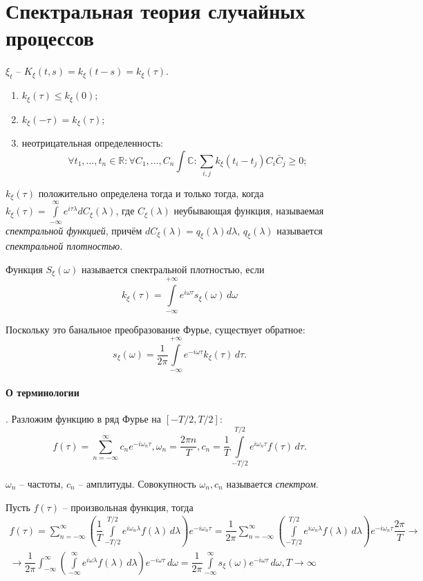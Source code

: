 \section{Спектральная теория случайных процессов}

$\xi_t$ -- $K_\xi(t, s) = k_\xi(t-s) = k_\xi(\tau)$.

\begin{enumerate}
  \item $k_\xi(\tau) \leqslant k_\xi(0)$;
  \item $k_\xi(-\tau) = k_\xi(\tau)$;
  \item неотрицательная определенность:
    \[
      \forall t_1, \dots, t_n \in \mathbb{R} :
      \forall C_1, \dots, C_n \int \mathbb{C}:
      \sum_{i,j} k_\xi(t_i - t_j) C_i \bar{C}_j \geqslant 0;
    \]
\end{enumerate}

\begin{theorem}
  $k_\xi(\tau)$ положительно определена тогда и только тогда, когда
  $k_\xi(\tau) = \int\limits_{-\infty}^{\infty} e^{i \tau \lambda} dC_\xi(\lambda)$,
  где $C_{\xi}(\lambda)$ неубывающая функция, называемая \emph{спектральной функцией},
  причём
  $dC_\xi(\lambda) = q_\xi(\lambda) d\lambda$, $q_\xi(\lambda)$ называется
  \emph{спектральной плотностью}.
\end{theorem}

\begin{definition}
  Функция $S_\xi(\omega)$ называется спектральной плотностью, если
  \[
    k_\xi(\tau) = \int\limits_{-\infty}^{+\infty} e^{i\omega\tau} s_\xi(\omega) \, d\omega
  \]
\end{definition}
Поскольку это банальное преобразование Фурье, существует обратное:
\[
  s_\xi(\omega) = \dfrac{1}{2\pi} \int\limits_{-\infty}^{+\infty} e^{-i\omega\tau} k_\xi(\tau) \, d\tau.
\]

\paragraph{О терминологии}. 
Разложим функцию в ряд Фурье на $[-T/2, T/2]$:
\[
  f(\tau) = \sum_{n=-\infty}^{\infty} c_n e^{-i\omega_n \tau}, \omega_n = \dfrac{2\pi n}{T},
  c_n = \dfrac{1}{T} \int\limits_{-T/2}^{T/2} e^{i\omega_n \tau} f(\tau) \, d\tau.
\]

$\omega_n$ -- частоты, $c_n$ -- амплитуды. Совокупность $\omega_n, c_n$ называется
\emph{спектром}.


Пусть $f(\tau)$ -- произвольная функция, тогда
\begin{multline*}
  f(\tau) = \sum_{n = -\infty}^{\infty}
    \left(
      \dfrac{1}{T} \int\limits_{-T/2}^{T/2} e^{i\omega_n \lambda} f(\lambda) \, d\lambda
    \right) e^{-i\omega_n \tau}
  = \dfrac{1}{2\pi} \sum_{n=-\infty}^\infty \left(
    \int\limits_{-T/2}^{T/2} e^{i\omega_n \lambda} f(\lambda) \, d\lambda \right)
    e^{-i\omega_n \tau} \dfrac{2\pi}{T} \to \\
  \to \dfrac{1}{2\pi} \int_{-\infty}^{\infty} \left( \int\limits_{-\infty}^{\infty} e^{i\omega\lambda} f(\lambda) \, d\lambda \right) e^{-i\omega\tau} \, d\omega
  = \dfrac{1}{2\pi} \int\limits_{-\infty}^\infty s_\xi(\omega) e^{-i\omega\tau} \, d\omega,
  T\to\infty
\end{multline*}

